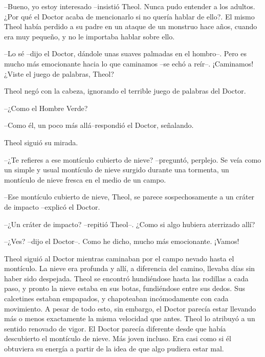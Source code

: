 --Bueno, yo estoy interesado --insistió Theol. Nunca pudo entender a los adultos. ¿Por qué el Doctor acaba de mencionarlo si no quería hablar de ello?. El mismo Theol había perdido a su padre en un ataque de un monstruo hace años, cuando era muy pequeño, y no le importaba hablar sobre ello.



--Lo sé --dijo el Doctor, dándole unas suaves palmadas en el hombro--. Pero es mucho más emocionante hacia lo que caminamos --se echó a reír--. ¡Caminamos! ¿Viste el juego de palabras, Theol?



Theol negó con la cabeza, ignorando el terrible juego de palabras del Doctor.

--¿Como el Hombre Verde?



--Como él, un poco más allá--respondió el Doctor, señalando.



Theol siguió su mirada.

--¿Te refieres a ese montículo cubierto de nieve? --preguntó, perplejo. Se veía como un simple y usual montículo de nieve surgido durante una tormenta, un montículo de nieve fresca en el medio de un campo.



--Ese montículo cubierto de nieve, Theol, se parece sospechosamente a un cráter de impacto --explicó el Doctor.



--¿Un cráter de impacto? --repitió Theol--. ¿Como si algo hubiera aterrizado allí?



--¿Ves? --dijo el Doctor--. Como he dicho, mucho más emocionante. ¡Vamos!



Theol siguió al Doctor mientras caminaban por el campo nevado hasta el montículo. La nieve era profunda y allí, a diferencia del camino, llevaba días sin haber sido despejada. Theol se encontró hundiéndose hasta las rodillas a cada paso, y pronto la nieve estaba en sus botas, fundiéndose entre sus dedos. Sus calcetines estaban empapados, y chapoteaban incómodamente con cada movimiento. A pesar de todo esto, sin embargo, el Doctor parecía estar llevando más o menos exactamente la misma velocidad que antes. Theol lo atribuyó a un sentido renovado de vigor. El Doctor parecía diferente desde que había descubierto el montículo de nieve. Más joven incluso. Era casi como si él obtuviera su energía a partir de la idea de que algo pudiera estar mal.



